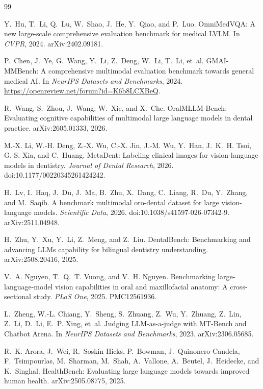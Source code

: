\documentclass[11pt]{article}
\begin{document}
\begin{thebibliography}{99}
\raggedright

Y.~Hu, T.~Li, Q.~Lu, W.~Shao, J.~He, Y.~Qiao, and P.~Luo.
\newblock OmniMedVQA: A new large-scale comprehensive evaluation benchmark for medical LVLM.
\newblock In \emph{CVPR}, 2024. arXiv:2402.09181.

P.~Chen, J.~Ye, G.~Wang, Y.~Li, Z.~Deng, W.~Li, T.~Li, et~al.
\newblock GMAI-MMBench: A comprehensive multimodal evaluation benchmark towards general medical AI.
\newblock In \emph{NeurIPS Datasets and Benchmarks}, 2024. \url{https://openreview.net/forum?id=K6b8LCXBeQ}.

R.~Wang, S.~Zhou, J.~Wang, W.~Xie, and X.~Che.
\newblock OralMLLM-Bench: Evaluating cognitive capabilities of multimodal large language models in dental practice.
\newblock arXiv:2605.01333, 2026.

M.-X. Li, W.-H. Deng, Z.-X. Wu, C.-X. Jin, J.-M. Wu, Y.~Han, J.~K.~H. Tsoi, G.-S. Xia, and C.~Huang.
\newblock MetaDent: Labeling clinical images for vision-language models in dentistry.
\newblock \emph{Journal of Dental Research}, 2026. doi:10.1177/00220345261424242.

H.~Lv, I.~Haq, J.~Du, J.~Ma, B.~Zhu, X.~Dang, C.~Liang, R.~Du, Y.~Zhang, and M.~Saqib.
\newblock A benchmark multimodal oro-dental dataset for large vision-language models.
\newblock \emph{Scientific Data}, 2026. doi:10.1038/s41597-026-07342-9. arXiv:2511.04948.

H.~Zhu, Y.~Xu, Y.~Li, Z.~Meng, and Z.~Liu.
\newblock DentalBench: Benchmarking and advancing LLMs capability for bilingual dentistry understanding.
\newblock arXiv:2508.20416, 2025.

V.~A. Nguyen, T.~Q.~T. Vuong, and V.~H. Nguyen.
\newblock Benchmarking large-language-model vision capabilities in oral and maxillofacial anatomy: A cross-sectional study.
\newblock \emph{PLoS One}, 2025. PMC12561936.

L.~Zheng, W.-L. Chiang, Y.~Sheng, S.~Zhuang, Z.~Wu, Y.~Zhuang, Z.~Lin, Z.~Li, D.~Li, E.~P. Xing, et~al.
\newblock Judging LLM-as-a-judge with MT-Bench and Chatbot Arena.
\newblock In \emph{NeurIPS Datasets and Benchmarks}, 2023. arXiv:2306.05685.

R.~K. Arora, J.~Wei, R.~Soskin Hicks, P.~Bowman, J.~Quinonero-Candela, F.~Tsimpourlas, M.~Sharman, M.~Shah, A.~Vallone, A.~Beutel, J.~Heidecke, and K.~Singhal.
\newblock HealthBench: Evaluating large language models towards improved human health.
\newblock arXiv:2505.08775, 2025.


\end{thebibliography}
\end{document}
